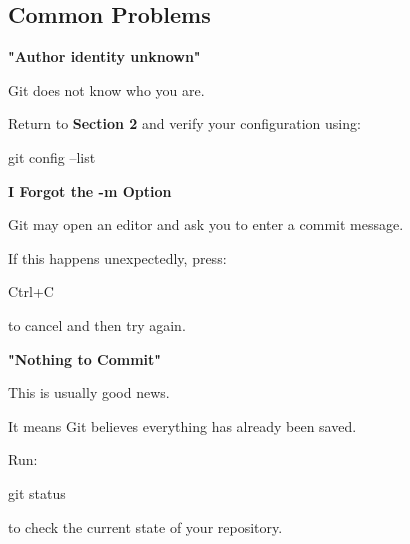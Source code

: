 \documentclass{csc2059practical}
\begin{document}
\subsection{Common Problems}
\begin{commonerror}
\textbf{"Author identity unknown"}\par
\medskip

Git does not know who you are.


Return to \textbf{Section 2} and verify your configuration using:


\begin{terminalplain}
  git config --list
\end{terminalplain}
\end{commonerror}
\begin{commonerror}
\textbf{I Forgot the -m Option}\par
\medskip

Git may open an editor and ask you to enter a commit message.


If this happens unexpectedly, press:


\begin{terminalplain}
  Ctrl+C
\end{terminalplain}
to cancel and then try again.

\end{commonerror}
\begin{commonerror}
\textbf{"Nothing to Commit"}\par
\medskip

This is usually good news.


It means Git believes everything has already been saved.


Run:


\begin{terminalplain}
  git status
\end{terminalplain}
to check the current state of your repository.
\end{commonerror}
\end{document}
